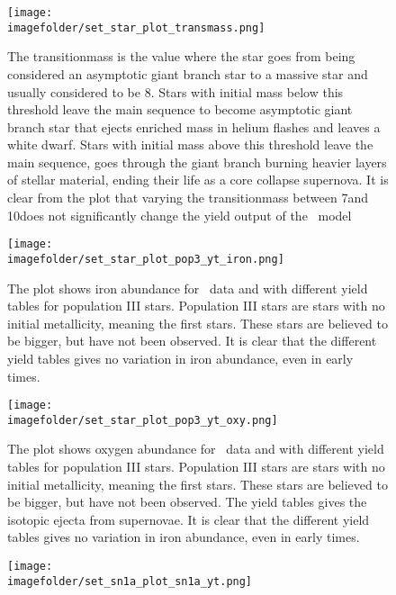 \begin{figure}[h]
  \centering
\end{figure}
\begin{figure}[h]
  \centering
  \texttt{[image: \\imagefolder/set\_star\_plot\_transmass.png]}
  \caption{\label{fig:fit-v2-agbm-transmass}
    The transitionmass is the value where the star goes from being considered an asymptotic giant branch star to a massive star and usually considered to be 8\msol.
    Stars with initial mass below this threshold leave the main sequence to become asymptotic giant branch star that ejects enriched mass in helium flashes and leaves a white dwarf.
    Stars with initial mass above this threshold leave the main sequence, goes through the giant branch burning heavier layers of stellar material, ending their life as a core collapse supernova.
    It is clear from the plot that varying the transitionmass between 7\msol and 10\msol does not significantly change the yield output of the \omegamodel\ model
  }
\end{figure}
\begin{figure}[h]
  \centering
  \texttt{[image: \\imagefolder/set\_star\_plot\_pop3\_yt\_iron.png]}
  \caption{\label{fig:fit-v2-pop3-yt-iron}
    The plot shows iron abundance for \eris\ data and \omegamodel with different yield tables for population III stars.
    Population III stars are stars with no initial metallicity, meaning the first stars. These stars are believed to be bigger, but have not been observed.
    It is clear that the different yield tables gives no variation in iron abundance, even in early times.
  }
\end{figure}
\begin{figure}[h]
  \centering
  \texttt{[image: \\imagefolder/set\_star\_plot\_pop3\_yt\_oxy.png]}
  \caption{\label{fig:fit-v2-pop3-yt-oxy}
    The plot shows oxygen abundance for \eris\ data and \omegamodel with different yield tables for population III stars.
    Population III stars are stars with no initial metallicity, meaning the first stars. These stars are believed to be bigger, but have not been observed. The yield tables gives the isotopic ejecta from supernovae.
    It is clear that the different yield tables gives no variation in iron abundance, even in early times.
  }
\end{figure}
\begin{figure}[h]
  \centering
  \texttt{[image: \\imagefolder/set\_sn1a\_plot\_sn1a\_yt.png]}
\end{figure}
